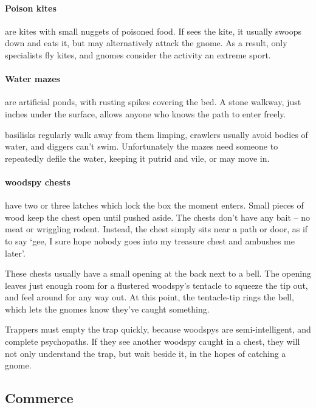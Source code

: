 \begin{multicols}{2}
\paragraph{Poison kites}
are kites with small nuggets of poisoned food.
If  sees the kite, it usually swoops down and eats it, but may alternatively attack the gnome.
As a result, only specialists fly kites, and gnomes consider the activity an extreme sport.

\paragraph{Water mazes}
are artificial ponds, with rusting spikes covering the bed.
A stone walkway, just inches under the surface, allows anyone who knows the path to enter freely.

\Glspl{basilisk} regularly walk away from them limping, \glspl{crawler} usually avoid bodies of water, and \glspl{digger} can't swim.
Unfortunately the mazes need someone to repeatedly defile the water, keeping it putrid and vile, or  may move in.

\paragraph{\Gls{woodspy} chests}
have two or three latches which lock the box the moment  enters.
Small pieces of wood keep the chest open until pushed aside.
The chests don't have any bait -- no meat or wriggling rodent.
Instead, the chest simply sits near a path or door, as if to say `gee, I sure hope nobody goes into my treasure chest and ambushes me later'.

These chests usually have a small opening at the back next to a bell.
The opening leaves just enough room for a flustered \gls{woodspy}'s  tentacle to squeeze the tip out, and feel around for any way out.
At this point, the tentacle-tip rings the bell, which lets the gnomes know they've caught something.

Trappers must empty the trap quickly, because \glspl{woodspy} are semi-intelligent, and complete psychopaths.
If they see another \gls{woodspy} caught in a chest, they will not only understand the trap, but wait beside it, in the hopes of catching a gnome.

\subsection{Commerce}


\end{multicols}
